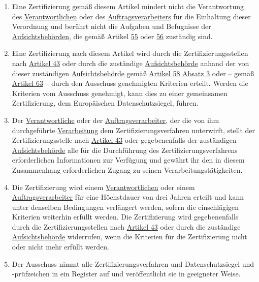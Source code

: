 \begin{enumerate}
  \item Eine Zertifizierung gemäß diesem Artikel mindert nicht die Verantwortung des \hyperref[itm:04-7]
   {Verantwortlichen} oder des
   \hyperref[itm:04-8]{Auftragsverarbeiters} für die Einhaltung dieser Verordnung und berührt nicht die Aufgaben und
    Befugnisse der
   \hyperref[itm:04-21]{Aufsichtsbehörden}, die gemäß Artikel \hyperref[ch:55]{55} oder \hyperref[ch:56]{56} zuständig
    sind.
  \label{itm:42-4}

  \item Eine Zertifizierung nach diesem Artikel wird durch die Zertifizierungsstellen nach \hyperref[ch:43]{Artikel 43}
   oder durch die zuständige \hyperref[itm:04-21]{Aufsichtsbehörde} anhand der von dieser zuständigen \hyperref
   [itm:04-21]{Aufsichtsbehörde} gemäß \hyperref[itm:58-3]{Artikel 58 Absatz 3} oder -- gemäß \hyperref[ch:63]
   {Artikel 63} -- durch den Ausschuss genehmigten Kriterien erteilt. Werden die Kriterien vom Ausschuss genehmigt,
   kann dies zu einer gemeinsamen Zertifizierung, dem Europäischen Datenschutzsiegel, führen.
  \label{itm:42-5}

  \item Der \hyperref[itm:04-7]{Verantwortliche} oder der \hyperref[itm:04-8]{Auftragsverarbeiter}, der die von ihm
   durchgeführte \hyperref[itm:04-2]{Verarbeitung} dem Zertifizierungsverfahren unterwirft, stellt der
   Zertifizierungsstelle nach \hyperref[ch:43]{Artikel 43} oder gegebenenfalls der zuständigen \hyperref[itm:04-21]
   {Aufsichtsbehörde} alle für die Durchführung des Zertifizierungsverfahrens erforderlichen Informationen zur
   Verfügung und gewährt ihr den in diesem Zusammenhang erforderlichen Zugang zu seinen Verarbeitungstätigkeiten.
  \label{itm:42-6}

  \item Die Zertifizierung wird einem \hyperref[itm:04-7]{Verantwortlichen} oder einem \hyperref[itm:04-8]
   {Auftragsverarbeiter} für eine Höchstdauer von drei Jahren erteilt und kann unter denselben Bedingungen verlängert
   werden, sofern die einschlägigen Kriterien weiterhin erfüllt werden. Die Zertifizierung wird gegebenenfalls
   durch die Zertifizierungsstellen nach \hyperref[ch:43]{Artikel 43} oder durch die zuständige \hyperref[itm:04-21]
   {Aufsichtsbehörde} widerrufen, wenn die Kriterien für die Zertifizierung nicht oder nicht mehr erfüllt
   werden.
  \label{itm:42-7}

  \item Der Ausschuss nimmt alle Zertifizierungsverfahren und Datenschutzsiegel und -prüfzeichen in ein Register auf und
   veröffentlicht sie in geeigneter Weise.
  \label{itm:42-8}

\end{enumerate}


